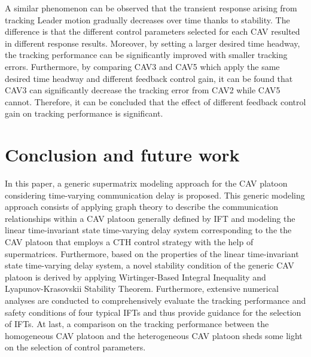 \documentclass[a4paper]{cas-sc}
\begin{document}
A similar phenomenon can be observed that the transient response arising from tracking Leader motion gradually decreases over time thanks to stability. The difference is that the different control parameters selected for each CAV resulted in different response results. Moreover, by setting a larger desired time headway, the tracking performance can be significantly improved with smaller tracking errors. Furthermore, by comparing CAV3 and CAV5 which apply the same desired time headway and different feedback control gain, it can be found that CAV3 can significantly decrease the tracking error from CAV2 while CAV5 cannot. Therefore, it can be concluded that the effect of different feedback control gain on tracking performance is significant.



\section{Conclusion and future work}
\label{Section 6}

In this paper, a generic supermatrix modeling approach for the CAV platoon considering time-varying communication delay is proposed. This generic modeling approach consists of applying graph theory to describe the communication relationships within a CAV platoon generally defined by IFT and modeling the linear time-invariant state time-varying delay system corresponding to the the CAV platoon that employs a CTH control strategy with the help of supermatrices. Furthermore, based on the properties of the linear time-invariant state time-varying delay system, a novel stability condition of the generic CAV platoon is derived by applying Wirtinger-Based Integral Inequality and Lyapunov-Krasovskii Stability Theorem. Furthermore, extensive numerical analyses are conducted to comprehensively evaluate the tracking performance and safety conditions of four typical IFTs and thus provide guidance for the selection of IFTs. At last, a comparison on the tracking performance between the homogeneous CAV platoon and the heterogeneous CAV platoon sheds some light on the selection of control parameters.
\end{document}
